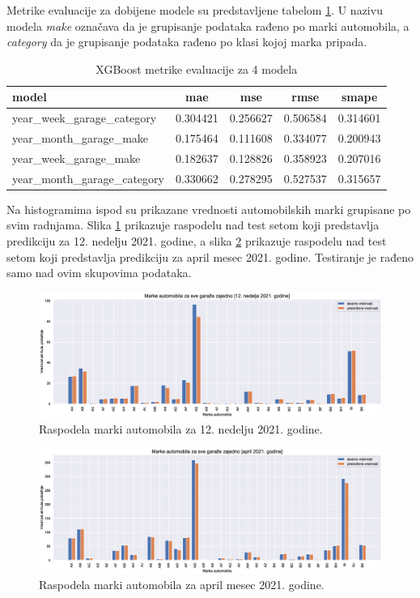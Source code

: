 \documentclass[12pt,oneside]{memoir}
\begin{document}
Metrike evaluacije za dobijene modele su predstavljene tabelom \ref{tbl: xgboost_atributi}. U nazivu modela \textit{make} označava da je grupisanje podataka rađeno po marki automobila, a \textit{category} da je grupisanje podataka rađeno po klasi kojoj marka pripada.
\begin{table}
\centering
\caption{XGBoost metrike evaluacije za 4 modela}
\label{tbl: xgboost_atributi}
\begin{tabular}{ |l|c|c|c|c|} 
\hline
model & mae & mse & rmse & smape \\
\hline
year\_week\_garage\_category & 0.304421 & 0.256627 & 0.506584 & 0.314601 \\ 
year\_month\_garage\_make & 0.175464 & 0.111608 & 0.334077 & 0.200943 \\
year\_week\_garage\_make & 0.182637 & 0.128826 & 0.358923 & 0.207016 \\
year\_month\_garage\_category & 0.330662 & 0.278295 & 0.527537 & 0.315657 \\
\hline
\end{tabular}
\end{table}
Na histogramima ispod su prikazane vrednosti automobilskih marki grupisane po svim radnjama. Slika \ref{fig: marke_nedelja} prikazuje raspodelu nad test setom koji predstavlja predikciju za 12. nedelju 2021. godine, a slika \ref{fig: marke_mesec} prikazuje raspodelu nad test setom koji predstavlja predikciju za april mesec 2021. godine. Testiranje je rađeno samo nad ovim skupovima podataka.
\begin{figure}[!ht]
  \centering
  \includegraphics[width=1\textwidth]{./grafici/year_week_garage_make_train_on_all_available_202112.eps}
  \caption{Raspodela marki automobila za 12. nedelju 2021. godine.} 
  \label{fig: marke_nedelja}
\end{figure}

\begin{figure}[!ht]
  \centering
  \includegraphics[width=1\textwidth]{./grafici/year_month_garage_make_train_on_all_available_202104.eps}
  \caption{Raspodela marki automobila za april mesec 2021. godine.}
  \label{fig: marke_mesec}
\end{figure}
\end{document}
